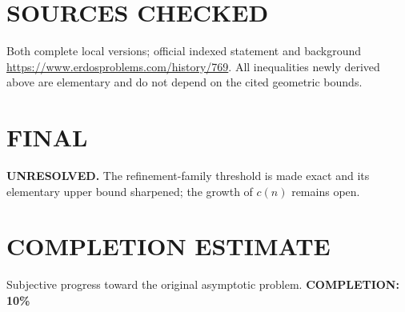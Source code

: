 \section{SOURCES CHECKED}
Both complete local versions; official indexed statement and background \url{https://www.erdosproblems.com/history/769}. All inequalities newly derived above are elementary and do not depend on the cited geometric bounds.
\section{FINAL}
\textbf{UNRESOLVED.} The refinement-family threshold is made exact and its elementary upper bound sharpened; the growth of $c(n)$ remains open.
\section{COMPLETION ESTIMATE}
Subjective progress toward the original asymptotic problem.
\textbf{COMPLETION: 10\%}
